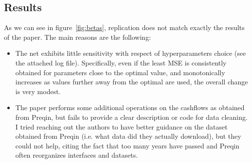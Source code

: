 \documentclass[12pt]{article}
\begin{document}
    \subsection{Results}\label{subsec:results}

    As we can see in figure~\ref{fig:betas}, replication does not match exactly the results of the paper.
    The main reasons are the following:
    \begin{itemize}
        \item The net exhibits little sensitivity with respect of hyperparameters choice (see the attached log file).
        Specifically, even if the least MSE is consistently obtained for parameters close to the optimal value, and monotonically increases as values further away from the optimal are used, the overall change is very modest.
        \item The paper performs some additional operations on the cashflows as obtained from Preqin, but fails to provide a clear description or code for data cleaning.
        I tried reaching out the authors to have better guidance on the dataset obtained from Preqin (i.e. what data did they actually download), but they could not help, citing the fact that too many years have passed and Preqin often reorganizes interfaces and datasets.
    \end{itemize}
\end{document}
